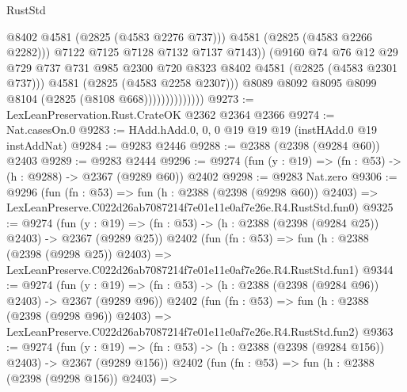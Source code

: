 \begin{lexlean}{RustStd}
\begin{coremodule}
                                      @8402
                                      @4581
                                      (@2825 (@4583 @2276 @737)))
                                    @4581
                                    (@2825 (@4583 @2266 @2282)))
                                  @7122
                                  @7125
                                  @7128
                                  @7132
                                  @7137
                                  @7143))
                              (@9160
                                @74
                                @76
                                @12
                                @29
                                @729
                                @737
                                @731
                                @985
                                @2300
                                @720
                                @8323
                                @8402
                                @4581
                                (@2825 (@4583 @2301 @737)))
                              @4581
                              (@2825 (@4583 @2258 @2307)))
                            @8089
                            @8092
                            @8095
                            @8099
                            @8104
                            (@2825 (@8108 @668))))))))))))))
@9273 := LexLeanPreservation.Rust.CrateOK @2362 @2364 @2366
@9274 := Nat.casesOn.{0}
@9283 := HAdd.hAdd.{0, 0, 0} @19 @19 @19 (instHAdd.{0} @19 instAddNat)
@9284 := @9283 @2446
@9288 := @2388 (@2398 (@9284 @60)) @2403
@9289 := @9283 @2444
@9296 := @9274 (fun (y : @19) => (fn : @53) -> (h : @9288) -> @2367 (@9289 @60)) @2402
@9298 := @9283 Nat.zero
@9306 := @9296
    (fun (fn : @53) =>
    fun (h : @2388 (@2398 (@9298 @60)) @2403) =>
    LexLeanPreserve.C022d26ab7087214f7e01e11e0af7e26e.R4.RustStd.fun0)
@9325 := @9274
    (fun (y : @19) => (fn : @53) -> (h : @2388 (@2398 (@9284 @25)) @2403) -> @2367 (@9289 @25))
    @2402
    (fun (fn : @53) =>
    fun (h : @2388 (@2398 (@9298 @25)) @2403) =>
    LexLeanPreserve.C022d26ab7087214f7e01e11e0af7e26e.R4.RustStd.fun1)
@9344 := @9274
    (fun (y : @19) => (fn : @53) -> (h : @2388 (@2398 (@9284 @96)) @2403) -> @2367 (@9289 @96))
    @2402
    (fun (fn : @53) =>
    fun (h : @2388 (@2398 (@9298 @96)) @2403) =>
    LexLeanPreserve.C022d26ab7087214f7e01e11e0af7e26e.R4.RustStd.fun2)
@9363 := @9274
    (fun (y : @19) => (fn : @53) -> (h : @2388 (@2398 (@9284 @156)) @2403) -> @2367 (@9289 @156))
    @2402
    (fun (fn : @53) =>
    fun (h : @2388 (@2398 (@9298 @156)) @2403) =>

\end{coremodule}
\end{lexlean}
